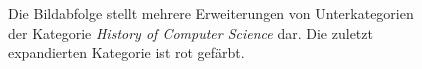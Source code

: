 \begin{figure}[H]
    \centering
    \caption{Die Bildabfolge stellt mehrere Erweiterungen von Unterkategorien der Kategorie \emph{History of Computer Science} dar. Die zuletzt expandierten Kategorie ist rot gefärbt.}
    \label{fig:expand-cat}
\end{figure}

